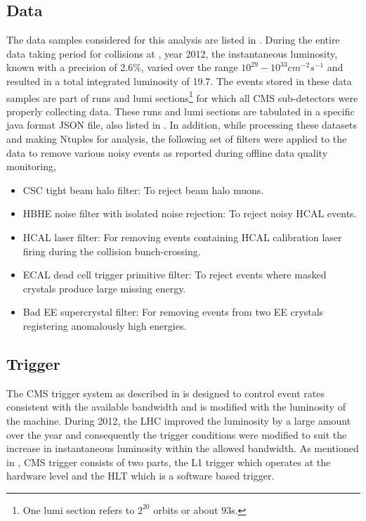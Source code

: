 \subsection{Data}
The data samples considered for this analysis are listed in \tab{\ref{tab:datasets}}. During the entire data taking period for \pp collisions
at \sqrteighttev, \ie year 2012, the instantaneous luminosity, known with a precision of 2.6\%, varied over the range 
$10^{29}-10^{33}\unit{cm^{-2}s^{-1}}$ and resulted in a total integrated luminosity of 19.7\fbinv. The events stored in these data 
samples are part of runs and lumi sections\footnote{One lumi section refers to $2^{20}$ orbits or about 93\unit{s}.} for which all CMS sub-detectors were properly collecting data. These runs and lumi sections 
are tabulated in a specific java format JSON file, also listed in \tab{\ref{tab:datasets}}. 
In addition, while processing these datasets and making Ntuples for analysis, the following set of filters were applied to the data to remove
various noisy events as reported during offline data quality monitoring, 
\begin{itemize}
\item CSC tight beam halo filter: To reject beam halo muons.
\item HBHE noise filter with isolated noise rejection: To reject noisy HCAL events.
\item HCAL laser filter: For removing events containing HCAL calibration laser firing during the collision bunch-crossing.
\item ECAL dead cell trigger primitive filter: To reject events where masked crystals produce large missing energy.
\item Bad EE supercrystal filter: For removing events from two EE crystals registering anomalously high energies. 
\end{itemize}

\subsection{Trigger}
The CMS trigger system as described in \sectn{\ref{Se:triDas}} is designed to control event rates consistent with the available bandwidth and 
is modified with the luminosity of the machine. During 2012, the LHC improved the luminosity by a large amount over the year and consequently the 
trigger conditions were modified to suit the increase in instantaneous luminosity within the allowed bandwidth. As mentioned in \sectn{\ref{Se:triDas}}, 
CMS trigger consists of two parts, the L1 trigger which operates at the hardware level and the HLT which is a software based trigger. 

